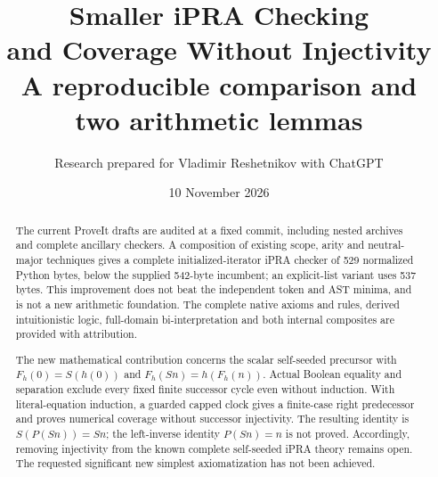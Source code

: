 \documentclass[11pt,letterpaper]{article}
\title{\color{ink}\bfseries Smaller iPRA Checking\\and Coverage Without Injectivity\\[9pt]
\large A reproducible comparison and two arithmetic lemmas}
\author{Research prepared for Vladimir Reshetnikov with ChatGPT}
\date{10 November 2026}
\theoremstyle{definition}\newtheorem{definition}[theorem]{Definition}
\theoremstyle{remark}\newtheorem{remark}[theorem]{Remark}
\begin{document}
\maketitle
\begin{abstract}
The current ProveIt drafts are audited at a fixed commit, including nested
archives and complete ancillary checkers. A composition of existing scope,
arity and neutral-major techniques gives a complete initialized-iterator
iPRA checker of 529 normalized Python bytes, below the supplied 542-byte
incumbent; an explicit-list variant uses 537 bytes. This improvement does
not beat the independent token and AST minima, and is not a new arithmetic
foundation. The complete native axioms and rules, derived intuitionistic
logic, full-domain bi-interpretation and both internal composites are
provided with attribution.

The new mathematical contribution concerns the scalar self-seeded precursor
with $F_h(0)=S(h(0))$ and $F_h(Sn)=h(F_h(n))$. Actual Boolean equality and
separation exclude every fixed finite successor cycle even without
induction. With literal-equation induction, a guarded capped clock gives
a finite-case right predecessor and proves numerical coverage without
successor injectivity. The resulting identity is $S(P(Sn))=Sn$; the
left-inverse identity $P(Sn)=n$ is not proved. Accordingly, removing
injectivity from the known complete self-seeded iPRA theory remains open.
The requested significant new simplest axiomatization has not been achieved.
\end{abstract}
\begin{center}
\end{center}
\clearpage
\setcounter{tocdepth}{1}
\hypersetup{bookmarksdepth=2}
\begingroup\small\setlength{\parskip}{0pt}\tableofcontents\endgroup
\clearpage





\end{document}
